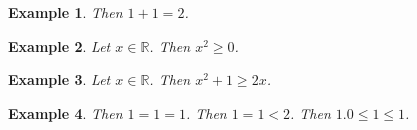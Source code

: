 \documentclass[12pt]{article}
\newtheorem{example}{Example}
\begin{document}
\begin{example}
    Then $1+1=2$.
\end{example}

\begin{example}
    Let $x\in\mathbb{R}$. Then $x^2\ge 0$.
\end{example}

\begin{example}
    Let $x\in\mathbb{R}$. Then $x^2 + 1\ge 2x$.
\end{example}

\begin{example}
    Then $1=1=1$. Then $1=1<2$. Then $1.0 \le 1 \le 1$.
\end{example}
\end{document}
